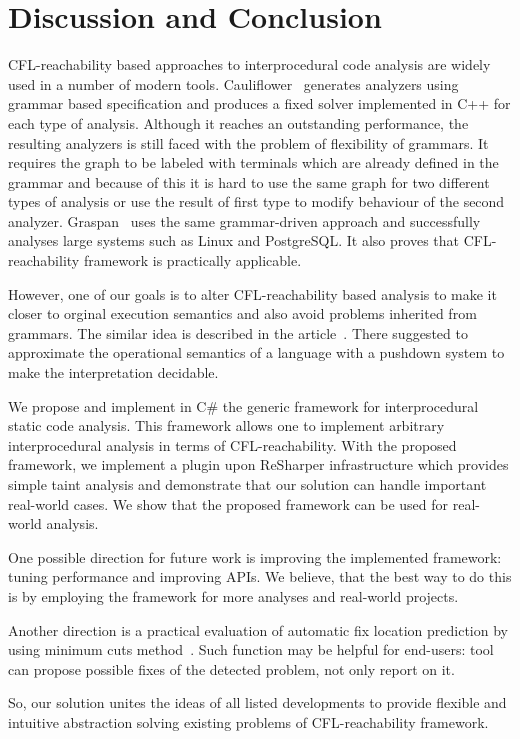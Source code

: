 \section{Discussion and Conclusion}

CFL-reachability based approaches to interprocedural code analysis are widely used in a number of modern tools.
Cauliflower~\cite{LPAR-21:Cauliflower_Solver_Generator_for} generates analyzers using grammar based specification and produces a fixed solver implemented in C++ for each type of analysis.
Although it reaches an outstanding performance, the resulting analyzers is still faced with the problem of flexibility of grammars.
It requires the graph to be labeled with terminals which are already defined in the grammar and because of this it is hard to use the same graph for two different types of analysis or use the result of first type to modify behaviour of the second analyzer.
Graspan~\cite{Wang:2017:GSD:3093315.3037744} uses the same grammar-driven approach and successfully analyses large systems such as Linux and PostgreSQL.
It also proves that CFL-reachability framework is practically applicable.

However, one of our goals is to alter CFL-reachability based analysis to make it closer to orginal execution semantics and also avoid problems inherited from grammars.
The similar idea is described in the article~\cite{Facchinetti:2019:HDP:3343145.3310340}.
There suggested to approximate the operational semantics of a language with a pushdown system to make the interpretation decidable.

We propose and implement in C\# the generic framework for interprocedural static code analysis.
This framework allows one to implement arbitrary interprocedural analysis in terms of CFL-reachability.
With the proposed framework, we implement a plugin upon ReSharper infrastructure which provides simple taint analysis and demonstrate that our solution can handle important real-world cases.
We show that the proposed framework can be used for real-world analysis.

One possible direction for future work is improving the implemented framework: tuning performance and improving APIs. 
We believe, that the best way to do this is by employing the framework for more analyses and real-world projects. 

Another direction is a practical evaluation of automatic fix location prediction by using minimum cuts method~\cite{10.1007/978-3-319-63390-9_27}.
Such function may be helpful for end-users: tool can propose possible fixes of the detected problem, not only report on it.

So, our solution unites the ideas of all listed developments to provide flexible and intuitive abstraction solving existing problems of CFL-reachability framework.
